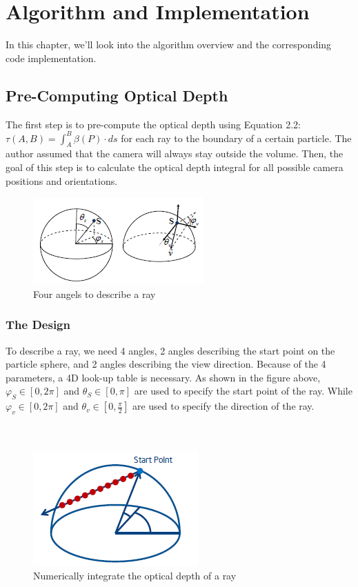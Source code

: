 \chapter{Algorithm and Implementation}
In this chapter, we'll look into the algorithm overview and the corresponding code implementation.

\section{Pre-Computing Optical Depth}
The first step is to pre-compute the optical depth using Equation 2.2: $\tau(A, B) = \int_{A}^{B}\beta(P)\cdot ds$ for each ray to the boundary of a certain particle. The author assumed that the camera will always stay outside the volume. Then, the goal of this step is to calculate the optical depth integral for all possible camera positions and orientations.

\begin{figure}[htp]
\begin{center}
\includegraphics[scale=1.0]{images/startandview.png}
\caption{Four angels to describe a ray}
\label{f8}
\end{center}
\end{figure}

\subsection{The Design}
To describe a ray, we need 4 angles, 2 angles describing the start point on the particle sphere, and 2 angles describing the view direction. Because of the 4 parameters, a 4D look-up table is necessary. As shown in the figure above, $\varphi_S\in[0, 2\pi]$ and $\theta_S\in[0, \pi]$ are used to specify the start point of the ray. While $\varphi_v\in[0, 2\pi]$ and $\theta_v\in[0, \frac{\pi}{2}]$ are used to specify the direction of the ray.\\\\\\

\begin{figure}[htp]
\begin{center}
\includegraphics[scale=0.5]{images/opticaldepthintegration.png}
\caption{Numerically integrate the optical depth of a ray}
\label{f9}
\end{center}
\end{figure}

